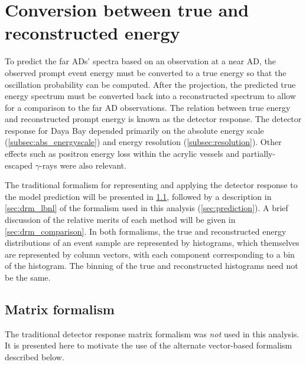 \chapter{Conversion between true and reconstructed energy}
\label{ap:drm}

To predict the far ADs' \nuebar{} spectra based on
an observation at a near AD,
the observed prompt event energy must be converted
to a true \nuebar{} energy
so that the oscillation probability can be computed.
After the projection, the predicted true energy spectrum
must be converted back into a reconstructed spectrum
to allow for a comparison to the far AD observations.
The relation between true \nuebar{} energy
and reconstructed prompt energy
is known as the detector response.
The detector response for Daya Bay
depended primarily on the absolute energy scale (\cref{subsec:abs_energyscale})
and energy resolution (\cref{subsec:resolution}).
Other effects such as positron energy loss within the acrylic vessels
and partially-escaped $\gamma$-rays were also relevant.

The traditional formalism for representing and applying
the detector response to the model prediction will be presented
in \cref{sec:drm_traditional},
followed by a description in \cref{sec:drm_lbnl}
of the formalism used in this analysis (\cref{sec:prediction}).
A brief discussion of the relative merits of each method
will be given in \cref{sec:drm_comparison}.
In both formalisms, the true and reconstructed energy distributions
of an event sample are represented by histograms,
which themselves are represented by column vectors,
with each component corresponding to a bin of the histogram.
The binning of the true and reconstructed histograms
need not be the same.

\section{Matrix formalism}
\label{sec:drm_traditional}

The traditional detector response matrix formalism
was \emph{not} used in this analysis.
It is presented here to motivate the use of the alternate vector-based formalism
described below.

